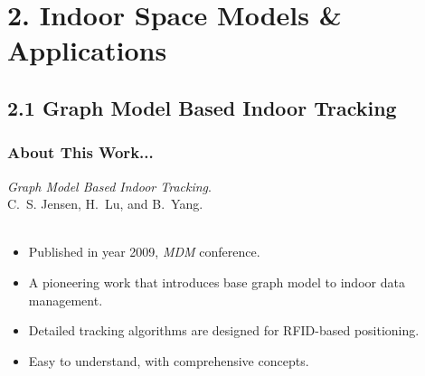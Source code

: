 \documentclass{beamer}
\begin{document}
\section{2. Indoor Space Models \& Applications} %

\subsection{2.1 Graph Model Based Indoor Tracking} %

\begin{frame}
\frametitle{About This Work...}
\emph{Graph Model Based Indoor Tracking}.~\cite{DBLP:conf/mdm/JensenLY09} \\ C.~S. Jensen, H.~Lu, and B.~Yang.\\~\\
\begin{itemize}
\item Published in year 2009, \emph{MDM} conference.
\item A pioneering work that introduces base graph model to indoor data management.
\item Detailed tracking algorithms are designed for RFID-based positioning.
\item Easy to understand, with comprehensive concepts.
\end{itemize}

\end{frame}

\end{document}
